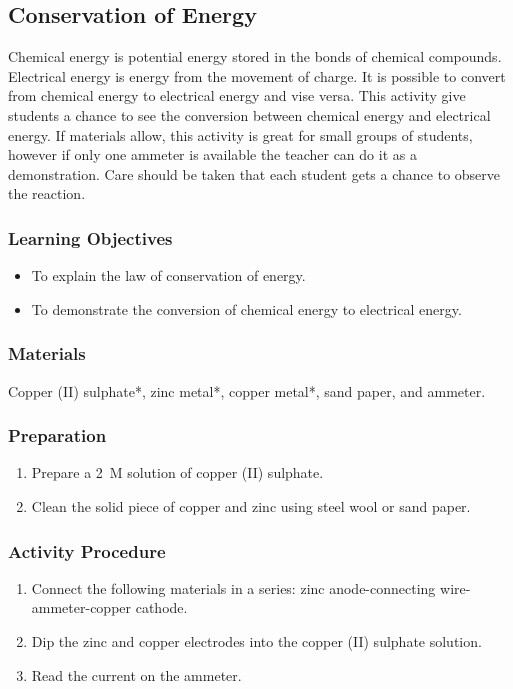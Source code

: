 \subsection{Conservation of Energy}
Chemical energy is potential energy stored in the bonds of chemical compounds. Electrical energy is energy from the movement of charge. It is possible to convert from chemical energy to electrical energy and vise versa. This activity give students a chance to see the conversion between chemical energy and electrical energy. If materials allow, this activity is great for small groups of students, however if only one ammeter is available the teacher can do it as a demonstration. Care should be taken that each student gets a chance to observe the reaction. 
\subsubsection*{Learning Objectives}
\begin{itemize}
\item{To explain the law of conservation of energy.}
\item{To demonstrate the conversion of chemical energy to electrical energy.}
\end{itemize}

\subsubsection*{Materials}
Copper (II) sulphate*, zinc metal*, copper metal*, sand paper, and ammeter.

\subsubsection*{Preparation}
\begin{enumerate}
\item{Prepare a 2~M solution of copper (II) sulphate.}
\item{Clean the solid piece of copper and zinc using steel wool or sand paper.}
\end{enumerate}

\subsubsection*{Activity Procedure}
\begin{enumerate}
\item{Connect the following materials in a series: zinc anode-connecting wire-ammeter-copper cathode.}
\item{Dip the zinc and copper electrodes into the copper (II) sulphate solution.}
\item{Read the current on the ammeter.}
\end{enumerate}

